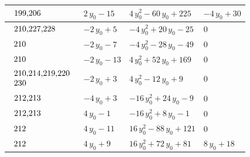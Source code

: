 \begin{table}[H]
\begin{center}
{\begin{tabular}{|l|l|l|l|}
$\begin{tabular}{l}
199,206 \\
\end{tabular}$ & $ 2 \, y_{0} - 15 $ & $ 4 \, y_{0}^{2} - 60 \, y_{0} + 225 $ & $ -4 \, y_{0} + 30 $ \\ \hline
$\begin{tabular}{l}
210,227,228 \\
\end{tabular}$ & $ -2 \, y_{0} + 5 $ & $ -4 \, y_{0}^{2} + 20 \, y_{0} - 25 $ & $ 0 $ \\ \hline
$\begin{tabular}{l}
210 \\
\end{tabular}$ & $ -2 \, y_{0} - 7 $ & $ -4 \, y_{0}^{2} - 28 \, y_{0} - 49 $ & $ 0 $ \\ \hline
$\begin{tabular}{l}
210 \\
\end{tabular}$ & $ -2 \, y_{0} - 13 $ & $ 4 \, y_{0}^{2} + 52 \, y_{0} + 169 $ & $ 0 $ \\ \hline
$\begin{tabular}{l}
210,214,219,220 \\
230 \\
\end{tabular}$ & $ -2 \, y_{0} + 3 $ & $ 4 \, y_{0}^{2} - 12 \, y_{0} + 9 $ & $ 0 $ \\ \hline
$\begin{tabular}{l}
212,213 \\
\end{tabular}$ & $ -4 \, y_{0} + 3 $ & $ -16 \, y_{0}^{2} + 24 \, y_{0} - 9 $ & $ 0 $ \\ \hline
$\begin{tabular}{l}
212,213 \\
\end{tabular}$ & $ 4 \, y_{0} - 1 $ & $ -16 \, y_{0}^{2} + 8 \, y_{0} - 1 $ & $ 0 $ \\ \hline
$\begin{tabular}{l}
212 \\
\end{tabular}$ & $ 4 \, y_{0} - 11 $ & $ 16 \, y_{0}^{2} - 88 \, y_{0} + 121 $ & $ 0 $ \\ \hline
$\begin{tabular}{l}
212 \\
\end{tabular}$ & $ 4 \, y_{0} + 9 $ & $ 16 \, y_{0}^{2} + 72 \, y_{0} + 81 $ & $ 8 \, y_{0} + 18 $ \\ \hline

\end{tabular}}
\end{center}
\end{table}
